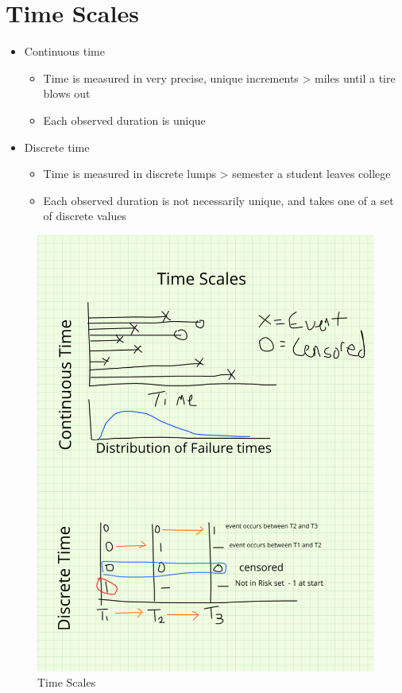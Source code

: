 \documentclass[
  letterpaper,
  DIV=11,
  numbers=noendperiod]{scrreprt}
\providecommand{\tightlist}{%
  \setlength{\itemsep}{0pt}\setlength{\parskip}{0pt}}\usepackage{longtable,booktabs,array}
\begin{document}
\hypertarget{time-scales}{%
\section{Time Scales}\label{time-scales}}

\begin{itemize}
\tightlist
\item
  Continuous time

  \begin{itemize}
  \tightlist
  \item
    Time is measured in very precise, unique increments \textgreater{}
    miles until a tire blows out
  \item
    Each observed duration is unique
  \end{itemize}
\item
  Discrete time

  \begin{itemize}
  \tightlist
  \item
    Time is measured in discrete lumps \textgreater{} semester a student
    leaves college
  \item
    Each observed duration is not necessarily unique, and takes one of a
    set of discrete values
  \end{itemize}
\end{itemize}

\begin{figure}

{\centering \includegraphics{./images/timescales.png}

}

\caption{Time Scales}

\end{figure}
\end{document}
